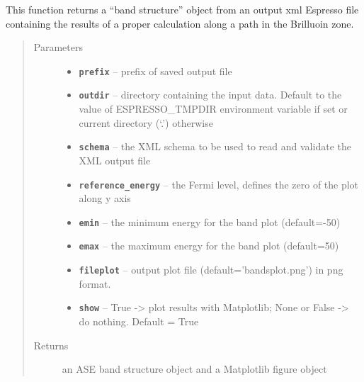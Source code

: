 \documentclass[letterpaper,10pt,english]{sphinxmanual}
\begin{document}

\begin{fulllineitems}
\label{postqe:postqe.api.compute_band_structure}
This function returns a ``band structure'' object from an output xml Espresso file
containing the results of a proper calculation along a path in the Brilluoin zone.
\begin{quote}\begin{description}
\item[{Parameters}] \leavevmode\begin{itemize}
\item {} 
\textbf{\texttt{prefix}} -- prefix of saved output file

\item {} 
\textbf{\texttt{outdir}} -- directory containing the input data. Default to the value of
ESPRESSO\_TMPDIR environment variable if set or current directory (`.') otherwise

\item {} 
\textbf{\texttt{schema}} -- the XML schema to be used to read and validate the XML output file

\item {} 
\textbf{\texttt{reference\_energy}} -- the Fermi level, defines the zero of the plot along y axis

\item {} 
\textbf{\texttt{emin}} -- the minimum energy for the band plot (default=-50)

\item {} 
\textbf{\texttt{emax}} -- the maximum energy for the band plot (default=50)

\item {} 
\textbf{\texttt{fileplot}} -- output plot file (default='bandsplot.png') in png format.

\item {} 
\textbf{\texttt{show}} -- True -\textgreater{} plot results with Matplotlib; None or False -\textgreater{} do nothing. Default = True

\end{itemize}

\item[{Returns}] \leavevmode
an ASE band structure object and a Matplotlib figure object

\end{description}\end{quote}

\end{fulllineitems}
\end{document}
